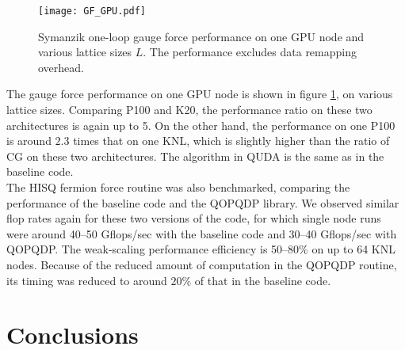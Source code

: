 \documentclass[epj]{webofc}
\begin{document}
\begin{figure}[thb]
  \centering
  \sidecaption
  \texttt{[image: GF\_GPU.pdf]}
  \caption{Symanzik one-loop gauge force performance on one GPU node and various lattice sizes $L$. 
  The performance excludes data remapping overhead.}
  \label{Fig.8}%
\end{figure}

\noindent{}The gauge force performance on one GPU node is shown in figure \ref{Fig.8}, 
on various lattice sizes. 
Comparing P100 and K20, the performance ratio on these two architectures is again up to 5. 
On the other hand, the performance on one P100 is around $2.3$ times that on one KNL, 
which is slightly higher than the ratio of CG on these two architectures. 
The algorithm in QUDA is the same as in the baseline code. \\




\noindent{}The HISQ fermion force routine was also benchmarked, %
comparing the performance of the baseline code and the QOPQDP library. 
We observed similar flop rates again for these two versions of the code, 
for which single node runs were around 40--50 Gflops/sec with the 
baseline code and 30--40 Gflops/sec with QOPQDP. 
The weak-scaling performance efficiency is 50--80\% on up to 64 KNL nodes. 
Because of the reduced amount of computation in the QOPQDP routine, 
its timing was reduced to around $20\%$ of that in the baseline code. 






\section{Conclusions}\label{sec-1}
\end{document}
